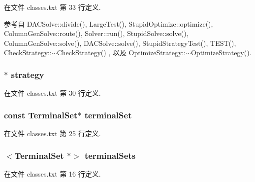 在文件 classes.\+txt 第 33 行定义.



参考自 D\+A\+C\+Solve\+::divide(), Large\+Test(), Stupid\+Optimize\+::optimize(), Column\+Gen\+Solve\+::route(), Solver\+::run(), Stupid\+Solve\+::solve(), Column\+Gen\+Solve\+::solve(), D\+A\+C\+Solve\+::solve(), Stupid\+Strategy\+Test(), T\+E\+S\+T(), Check\+Strategy\+::$\sim$\+Check\+Strategy() , 以及 Optimize\+Strategy\+::$\sim$\+Optimize\+Strategy().

\subsubsection[{\texorpdfstring{strategy}{strategy}}]{$\ast$ strategy}\hypertarget{classes_8txt_a849eb63b7a4e1c3628d4d0e94b9d8aed}{}\label{classes_8txt_a849eb63b7a4e1c3628d4d0e94b9d8aed}


在文件 classes.\+txt 第 30 行定义.

\subsubsection[{\texorpdfstring{terminal\+Set}{terminalSet}}]{ const {\bf Terminal\+Set}$\ast$ terminal\+Set}\hypertarget{classes_8txt_a597568d74a60fa533165215be11d5f0b}{}\label{classes_8txt_a597568d74a60fa533165215be11d5f0b}


在文件 classes.\+txt 第 25 行定义.

\subsubsection[{\texorpdfstring{terminal\+Sets}{terminalSets}}]{$<${\bf Terminal\+Set} $\ast$$>$ terminal\+Sets}\hypertarget{classes_8txt_aefc745d101147acb2777430132833faf}{}\label{classes_8txt_aefc745d101147acb2777430132833faf}


在文件 classes.\+txt 第 16 行定义.


